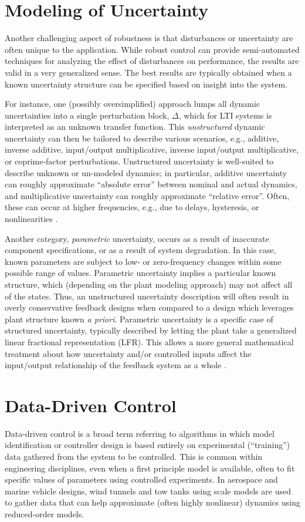 \section{Modeling of Uncertainty}
\label{chap:introModelingUncertainty}
Another challenging aspect of robustness is that disturbances or uncertainty are often unique to the application.  While robust control can provide semi-automated techniques for analyzing the effect of disturbances on performance, the results are valid in a very generalized sense.  The best results are typically obtained when a known uncertainty structure can be specified based on insight into the system.

For instance, one (possibly oversimplified) approach lumps all dynamic uncertainties into a single perturbation block, $\Delta$, which for LTI systems is interpreted as an unknown transfer function.  This \emph{unstructured} dynamic uncertainty can then be tailored to describe various scenarios, e.g., additive, inverse additive, input/output multiplicative, inverse input/output multiplicative, or coprime-factor perturbations.  Unstructured uncertainty is well-suited to describe unknown or un-modeled dynamics; in particular, additive uncertainty can roughly approximate ``absolute error'' between nominal and actual dynamics, and multiplicative uncertainty can roughly approximate ``relative error''.  Often, these can occur at higher frequencies, e.g., due to delays, hysteresis, or nonlinearities \cite{gu2005robust}.

Another category, \emph{parametric} uncertainty, occurs as a result of inaccurate component specifications, or as a result of system degradation.  In this case, known parameters are subject to low- or zero-frequency changes within some possible range of values.  Parametric uncertainty implies a particular known structure, which (depending on the plant modeling approach) may not affect all of the states.  Thus, an unstructured uncertainty description will often result in overly conservative feedback designs when compared to a design which leverages plant structure known \emph{a priori}.  Parametric uncertainty is a specific case of structured uncertainty, typically described by letting the plant take a generalized linear fractional representation (LFR).  This allows a more general mathematical treatment about how uncertainty and/or controlled inputs affect the input/output relationship of the feedback system as a whole \cite{gu2005robust}.

\section{Data-Driven Control}
\label{chap:introDataDrivenControl}
Data-driven control is a broad term referring to algorithms in which model identification or controller design is based entirely on experimental (``training'') data gathered from the system to be controlled.  This is common within engineering disciplines, even when a first principle model is available, often to fit specific values of parameters using controlled experiments.  In aerospace and marine vehicle designs, wind tunnels and tow tanks using scale models are used to gather data that can help approximate (often highly nonlinear) dynamics using reduced-order models.

